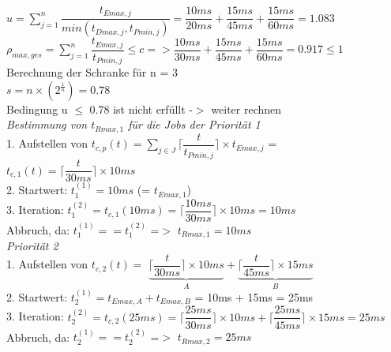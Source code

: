 \documentclass[12pt,a4paper,oneside,ngerman]{article}
\begin{document}
\(u = \displaystyle\sum_{j=1}^n \dfrac{t_{Emax,j}}{ min(t_{Dmax,j}, t_{Pmin,j})}  =  \dfrac{10ms}{20ms} + \dfrac{15ms}{45ms} + \dfrac{15ms}{60ms} = 1.083 \)\\
\(\rho_{max,ges} = \displaystyle\sum_{j=1}^n \dfrac{t_{Emax,j}}{t_{Pmin,j}} \leq c => \dfrac{10ms}{30ms} + \dfrac{15ms}{45ms} + \dfrac{15ms}{60ms} = 0.917 \leq 1\)\\

Berechnung der Schranke für n = 3 \\
\(s = n\times( 2^\frac{1}{n}) = 0.78\)\\

Bedingung u $\leq$ 0.78 ist nicht erfüllt -$>$ weiter rechnen\\

\emph{Bestimmung von \(t_{Rmax,1}\) für die Jobs der Priorität 1}\\
1. Aufstellen von \( t_{c,p}(t) = \displaystyle\sum_{j \in J} \Big\lceil \dfrac{t}{ t_{Pmin,j} } \Big\rceil \times t_{Emax,j} \) = \( t_{c,1}(t) = \Big\lceil \dfrac{t}{ 30ms } \Big\rceil \times 10ms \)\\
2. Startwert: \( t_{1}^{(1)} = 10ms \) (= \(t_{Emax,1}\)) \\
3. Iteration: \( t_{1}^{(2)} = t_{c,1}(10ms) = \Big\lceil \dfrac{10ms}{30ms} \Big\rceil \times 10ms = 10ms\)\\
Abbruch, da: \( t_{1}^{(1)} == t_{1}^{(2)} \) =$>$ \( t_{Rmax,1} = 10ms \)\\


\emph{Priorität 2}\\
1. Aufstellen von \( t_{c,2}(t) =\) \(\underbrace{\Big\lceil \dfrac{t}{ 30ms } \Big\rceil \times 10ms }_{A} + \underbrace{\Big\lceil \dfrac{t}{ 45ms } \Big\rceil \times 15ms}_{B}\) \\
2. Startwert: \( t_{2}^{(1)} = t_{Emax,A} + t_{Emax,B} \) = 10ms + 15ms = 25ms \\
3. Iteration: \( t_{2}^{(2)} = t_{c,2}(25ms) = \Big\lceil \dfrac{25ms}{30ms} \Big\rceil \times 10ms + \Big\lceil \dfrac{25ms}{45ms} \Big\rceil \times 15ms = 25ms\)\\
Abbruch, da: \( t_{2}^{(1)} == t_{2}^{(2)} \) =$>$ \( t_{Rmax,2} = 25ms \)\\
\end{document}

